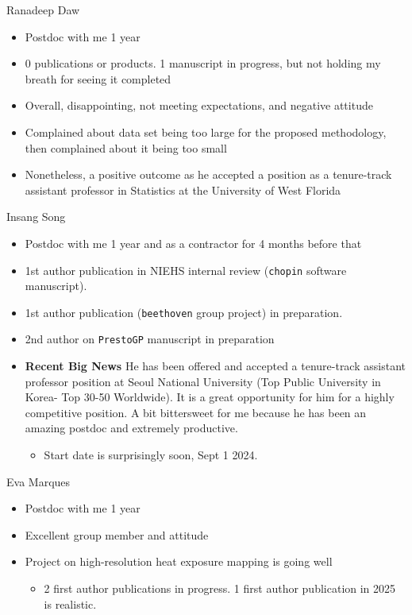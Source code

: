 \documentclass[
  ignorenonframetext,
]{beamer}
\providecommand{\tightlist}{%
  \setlength{\itemsep}{0pt}\setlength{\parskip}{0pt}}\usepackage{longtable,booktabs,array}
\begin{document}
\begin{frame}{Ranadeep Daw}
\label{ranadeep-daw}
\begin{itemize}
\tightlist
\item
  Postdoc with me 1 year
\item
  0 publications or products. 1 manuscript in progress, but not holding
  my breath for seeing it completed
\item
  Overall, disappointing, not meeting expectations, and negative
  attitude
\item
  Complained about data set being too large for the proposed
  methodology, then complained about it being too small
\item
  Nonetheless, a positive outcome as he accepted a position as a
  tenure-track assistant professor in Statistics at the University of
  West Florida
\end{itemize}
\end{frame}

\begin{frame}[fragile]{Insang Song}
\label{insang-song}
\begin{itemize}
\tightlist
\item
  Postdoc with me 1 year and as a contractor for 4 months before that
\item
  1st author publication in NIEHS internal review (\texttt{chopin}
  software manuscript).
\item
  1st author publication (\texttt{beethoven} group project) in
  preparation.
\item
  2nd author on \texttt{PrestoGP} manuscript in preparation
\item
  \textbf{Recent Big News} He has been offered and accepted a
  tenure-track assistant professor position at Seoul National University
  (Top Public University in Korea- Top 30-50 Worldwide). It is a great
  opportunity for him for a highly competitive position. A bit
  bittersweet for me because he has been an amazing postdoc and
  extremely productive.

  \begin{itemize}
  \tightlist
  \item
    Start date is surprisingly soon, Sept 1 2024.
  \end{itemize}
\end{itemize}
\end{frame}

\begin{frame}{Eva Marques}
\label{eva-marques}
\begin{itemize}
\tightlist
\item
  Postdoc with me 1 year
\item
  Excellent group member and attitude
\item
  Project on high-resolution heat exposure mapping is going well

  \begin{itemize}
  \tightlist
  \item
    2 first author publications in progress. 1 first author publication
    in 2025 is realistic.
  \end{itemize}
\end{itemize}
\end{frame}
\end{document}
